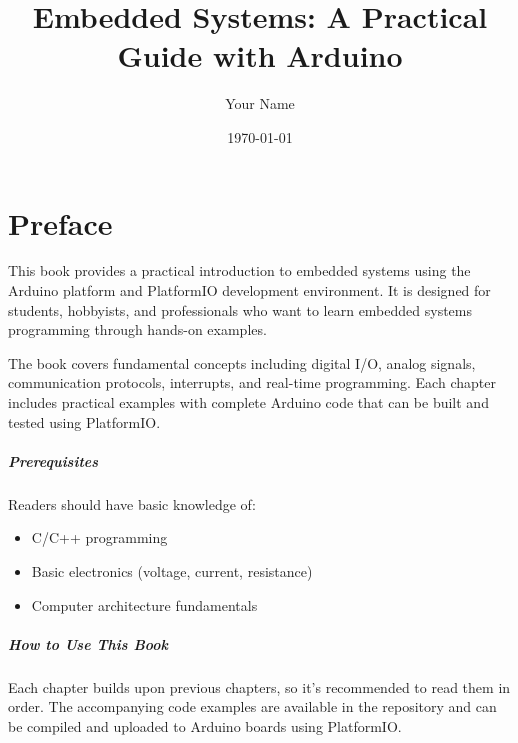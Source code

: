 \documentclass[12pt,a4paper]{book}
\title{Embedded Systems: A Practical Guide with Arduino}
\author{Your Name}
\date{\today}
\begin{document}
\maketitle

\tableofcontents
\newpage

\listoffigures
\newpage

\lstlistoflistings
\newpage

\chapter*{Preface}

This book provides a practical introduction to embedded systems using the Arduino platform and PlatformIO development environment. It is designed for students, hobbyists, and professionals who want to learn embedded systems programming through hands-on examples.

The book covers fundamental concepts including digital I/O, analog signals, communication protocols, interrupts, and real-time programming. Each chapter includes practical examples with complete Arduino code that can be built and tested using PlatformIO.

\paragraph{Prerequisites}
Readers should have basic knowledge of:
\begin{itemize}
    \item C/C++ programming
    \item Basic electronics (voltage, current, resistance)
    \item Computer architecture fundamentals
\end{itemize}

\paragraph{How to Use This Book}
Each chapter builds upon previous chapters, so it's recommended to read them in order. The accompanying code examples are available in the repository and can be compiled and uploaded to Arduino boards using PlatformIO.

\newpage



\end{document}
